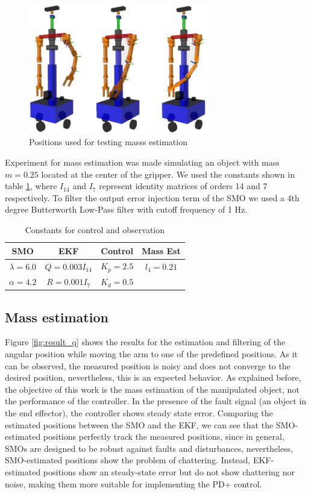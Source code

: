 \documentclass[a4paper, 10pt]{article}
\begin{document}
\begin{figure}[h!]
  \centering
  \includegraphics[width=0.7\textwidth]{Figures/test_poses.png}
  \caption{Positions used for testing masss estimation}
  \label{fig:test_poses}
\end{figure}

Experiment for mass estimation was made simulating an object with mass $m=0.25$ located at the center of the gripper. We used the constants shown in table \ref{tab:constants}, where $I_{14}$ and $I_7$ represent identity matrices of orders 14 and 7 respectively. To filter the output error injection term of the SMO we used a 4th degree Butterworth Low-Pass filter with cutoff frequency of 1 Hz. 
\begin{table}
  \centering
  \begin{tabular}{|c|c|c|c|}
    \hline
    SMO & EKF & Control & Mass Est\\
    \hline
    $\lambda=6.0$ & $Q = 0.003I_{14}$ & $K_p= 2.5$ & $l_4 = 0.21$\\
    $\alpha=4.2$ & $R = 0.001I_7$ & $K_d = 0.5$  & \\
    \hline
  \end{tabular}
  \caption{Constants for control and observation}
  \label{tab:constants}
\end{table}

\subsection{Mass estimation}
Figure \ref{fig:result_q} shows the results for the estimation and filtering of the angular position while moving the arm to one of the predefined positions. As it can be observed, the measured position is noisy and does not converge to the desired position, nevertheless, this is an expected behavior. As explained before, the objective of this work is the mass estimation of the manipulated object, not the performance of the controller. In the presence of the fault signal (an object in the end effector), the controller shows steady state error. Comparing the estimated positions between the SMO and the EKF, we can see that the SMO-estimated positions perfectly track the measured positions, since in general, SMOs are designed to be robust against faults and disturbances, nevertheless, SMO-estimated positions show the problem of chattering. Instead, EKF-estimated positions show an steady-state error but do not show chattering nor noise, making them more suitable for implementing the PD+ control. 
\end{document}

